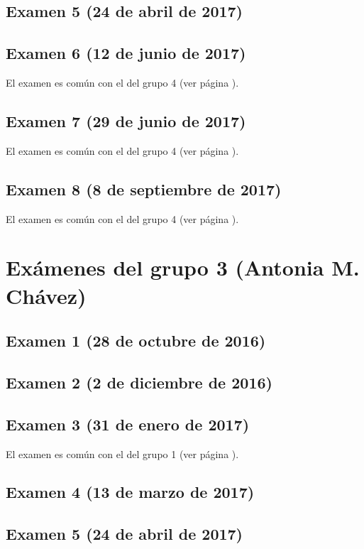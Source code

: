 \documentclass[a4paper,12pt,twoside]{book}
\begin{document}
\subsection{Examen 5 (24 de abril de 2017)}
\subsection{Examen 6 (12 de junio de 2017)} 
El examen es común con el del grupo 4 (ver página \pageref{examen_16_17_4_6}).
\subsection{Examen 7 (29 de junio de 2017)}
El examen es común con el del grupo 4 (ver página \pageref{examen_16_17_4_7}).
\subsection{Examen 8 (8 de septiembre de 2017)}
El examen es común con el del grupo 4 (ver página \pageref{examen_16_16_4_8}).

\section{Exámenes del grupo 3 (Antonia M. Chávez)}
\subsection{Examen 1 (28 de octubre de 2016)}
\subsection{Examen 2 (2 de diciembre de 2016)}
\subsection{Examen 3 (31 de enero de 2017)}
El examen es común con el del grupo 1 (ver página \pageref{examen_16_17_1_3}).
\subsection{Examen 4 (13 de marzo de 2017)}
\subsection{Examen 5 (24 de abril de 2017)}
\end{document}
